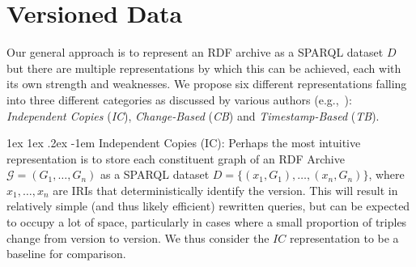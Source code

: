 \documentclass{llncs}
\makeatletter
\renewcommand\paragraph{\@startsection{paragraph}{4}{\z@}%
	{1ex \@plus1ex \@minus.2ex}%
	{-1em}%
	{\normalfont\normalsize\itshape}}
\makeatother
\begin{document}
\section{Versioned Data}

Our general approach is to represent an RDF archive as a SPARQL dataset $D$ but there are multiple representations by which this can be achieved, each with its own strength and weaknesses. We propose six different representations falling into three different categories as discussed by various authors (e.g.,~\cite{TzitzikasTA08,FernandezPU15}): \textit{Independent Copies} (\textit{IC}), \textit{Change-Based} (\textit{CB}) and \textit{Timestamp-Based} (\textit{TB}).

\paragraph{Independent Copies (IC):} Perhaps the most intuitive representation is to store each constituent graph of an RDF Archive $\mathcal{G} = (G_1,\ldots,G_n)$ as a SPARQL dataset $D = \{ (x_1,G_1), \ldots, (x_n,G_n)\}$, where $x_1,\ldots,x_n$ are IRIs that deterministically identify the version. This will result in relatively simple (and thus likely efficient) rewritten queries, but can be expected to occupy a lot of space, particularly in cases where a small proportion of triples change from version to version. We thus consider the $IC$ representation to be a baseline for comparison.
\end{document}

